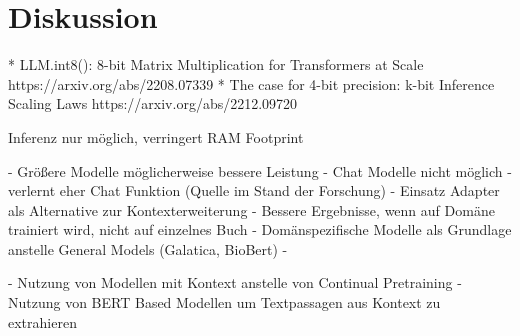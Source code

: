 \chapter{Diskussion}\label{ch:discussion}

* LLM.int8(): 8-bit Matrix Multiplication for Transformers at Scale https://arxiv.org/abs/2208.07339
* The case for 4-bit precision: k-bit Inference Scaling Laws https://arxiv.org/abs/2212.09720

Inferenz nur möglich, verringert RAM Footprint

- Größere Modelle möglicherweise bessere Leistung
- Chat Modelle nicht möglich - verlernt eher Chat Funktion (Quelle im Stand der Forschung)
- Einsatz Adapter als Alternative zur Kontexterweiterung
- Bessere Ergebnisse, wenn auf Domäne trainiert wird, nicht auf einzelnes Buch
- Domänspezifische Modelle als Grundlage anstelle General Models (Galatica, BioBert)
- 

- Nutzung von Modellen mit Kontext anstelle von Continual Pretraining
- Nutzung von BERT Based Modellen um Textpassagen aus Kontext zu extrahieren